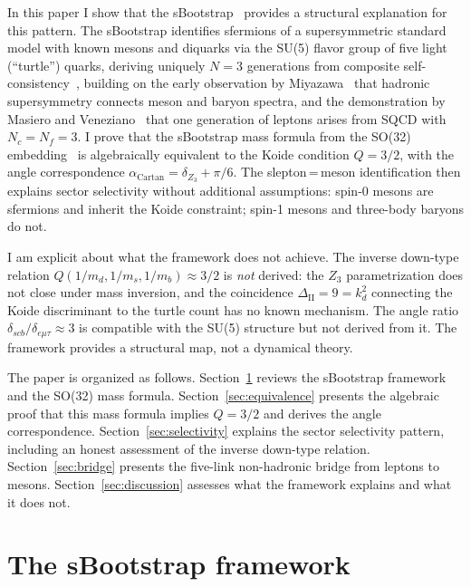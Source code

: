 \documentclass[prd,twocolumn,superscriptaddress,nofootinbib]{revtex4-2}
\begin{document}
In this paper I show that the sBootstrap~\cite{Rivero2009sboot,
Rivero2024so32} provides a structural explanation for this pattern.
The sBootstrap identifies sfermions of a supersymmetric standard model
with known mesons and diquarks via the SU(5) flavor group of five light
(``turtle'') quarks, deriving uniquely $N=3$ generations from
composite self-consistency~\cite{Rivero2007spectroscopy}, building on
the early observation by Miyazawa~\cite{Miyazawa1966} that hadronic
supersymmetry connects meson and baryon spectra, and the demonstration
by Masiero and Veneziano~\cite{MasieroVeneziano1984} that one
generation of leptons arises from SQCD with $N_c=N_f=3$.  I prove
that the sBootstrap mass formula from the SO(32)
embedding~\cite{Rivero2024so32} is algebraically equivalent to the
Koide condition $Q=3/2$, with the angle correspondence
$\alpha_{\text{Cartan}}=\delta_{Z_3}+\pi/6$.  The slepton\,=\,meson
identification then explains sector selectivity without additional
assumptions: spin-0 mesons are sfermions and inherit the Koide
constraint; spin-1 mesons and three-body baryons do not.

I am explicit about what the framework does not achieve.  The inverse
down-type relation $Q(1/m_d,1/m_s,1/m_b)\approx 3/2$ is \emph{not}
derived: the $Z_3$ parametrization does not close under mass
inversion, and the coincidence $\Delta_{\text{II}}=9=k_d^2$ connecting
the Koide discriminant to the turtle count has no known mechanism.  The
angle ratio $\delta_{scb}/\delta_{e\mu\tau}\approx 3$ is compatible
with the SU(5) structure but not derived from it.  The framework
provides a structural map, not a dynamical theory.

The paper is organized as follows.  Section~\ref{sec:sbootstrap}
reviews the sBootstrap framework and the SO(32) mass formula.
Section~\ref{sec:equivalence} presents the algebraic proof that this
mass formula implies $Q=3/2$ and derives the angle correspondence.
Section~\ref{sec:selectivity} explains the sector selectivity pattern,
including an honest assessment of the inverse down-type relation.
Section~\ref{sec:bridge} presents the five-link non-hadronic bridge
from leptons to mesons.
Section~\ref{sec:discussion} assesses what the framework explains and
what it does not.

\section{The sBootstrap framework}
\label{sec:sbootstrap}
\end{document}
